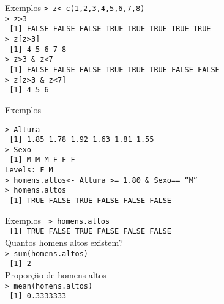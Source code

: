 \documentclass{beamer}
\begin{document}
\begin{frame}{Exemplos}
\texttt{> z<-c(1,2,3,4,5,6,7,8)\\ \vspace{10pt}
> z>3\\
~[1] FALSE FALSE FALSE  TRUE  TRUE  TRUE  TRUE  TRUE \\ \vspace{10pt}
> z[z>3]\\
~[1] 4 5 6 7 8 \\ \vspace{10pt} \pause
> z>3 \& z<7\\
~[1] FALSE FALSE FALSE  TRUE  TRUE  TRUE FALSE FALSE\\
> z[z>3 \& z<7] \\
~[1] 4 5 6
}
\end{frame}
\begin{frame}{Exemplos}

\texttt{> Altura\\
~[1] 1.85 1.78 1.92 1.63 1.81 1.55\\
> Sexo\\
~[1] M M M F F F\\
Levels: F M\\ \vspace{10pt} \pause
> homens.altos<- Altura >= 1.80 \& Sexo== ``M''\\
> homens.altos\\
~[1]  TRUE FALSE  TRUE FALSE FALSE FALSE}
 \end{frame}

 \begin{frame}{Exemplos}
\texttt{ > homens.altos \\
~[1]  TRUE FALSE  TRUE FALSE FALSE FALSE \\ \vspace{10pt}}
Quantos homens altos existem?\\
\texttt{> sum(homens.altos)\\
~[1] 2\\}
Proporção de homens altos \\
\texttt{> mean(homens.altos)\\
~[1] 0.3333333\\}
 \end{frame}
\end{document}
